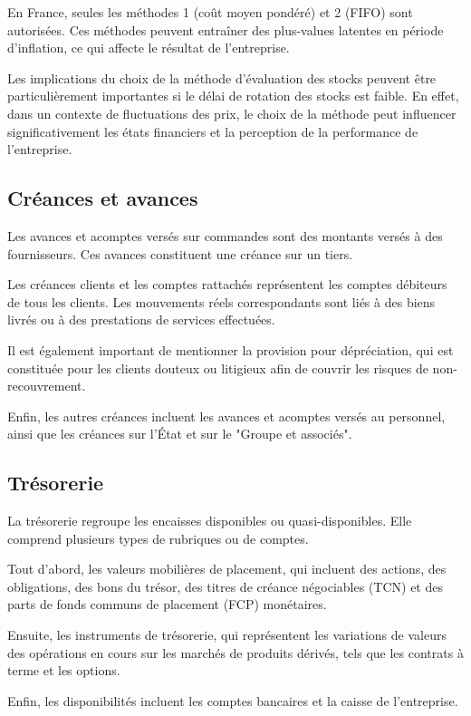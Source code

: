 \documentclass[a4paper, 12pt]{report}
\begin{document}
En France, seules les méthodes 1 (coût moyen pondéré) et 2 (FIFO) sont autorisées. Ces méthodes peuvent entraîner des plus-values latentes en période d'inflation, ce qui affecte le résultat de l'entreprise. 

Les implications du choix de la méthode d'évaluation des stocks peuvent être particulièrement importantes si le délai de rotation des stocks est faible. En effet, dans un contexte de fluctuations des prix, le choix de la méthode peut influencer significativement les états financiers et la perception de la performance de l'entreprise.

\subsection{Créances et avances}

Les avances et acomptes versés sur commandes sont des montants versés à des fournisseurs. Ces avances constituent une créance sur un tiers. 

Les créances clients et les comptes rattachés représentent les comptes débiteurs de tous les clients. Les mouvements réels correspondants sont liés à des biens livrés ou à des prestations de services effectuées. 

Il est également important de mentionner la provision pour dépréciation, qui est constituée pour les clients douteux ou litigieux afin de couvrir les risques de non-recouvrement.

Enfin, les autres créances incluent les avances et acomptes versés au personnel, ainsi que les créances sur l'État et sur le "Groupe et associés".

\subsection{Trésorerie}

La trésorerie regroupe les encaisses disponibles ou quasi-disponibles. Elle comprend plusieurs types de rubriques ou de comptes.

Tout d'abord, les valeurs mobilières de placement, qui incluent des actions, des obligations, des bons du trésor, des titres de créance négociables (TCN) et des parts de fonds communs de placement (FCP) monétaires. 

Ensuite, les instruments de trésorerie, qui représentent les variations de valeurs des opérations en cours sur les marchés de produits dérivés, tels que les contrats à terme et les options.

Enfin, les disponibilités incluent les comptes bancaires et la caisse de l'entreprise.
\end{document}
